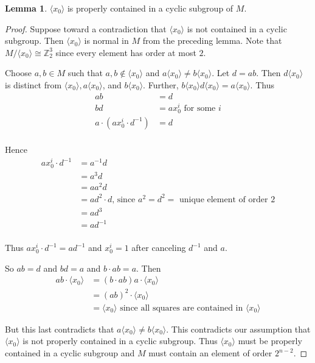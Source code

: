 \documentclass[12pt]{report}
\theoremstyle{definition}
\newtheorem{lem}[thm]{Lemma}
\begin{document}
\begin{lem}
	$\langle x_0 \rangle$ is properly contained in a cyclic subgroup of $M$.
\end{lem}

\begin{proof}
	Suppose toward a contradiction that $\langle x_0\rangle$ is not contained in a cyclic subgroup.
    Then $\langle x_0\rangle$ is normal in $M$ from the preceding lemma. Note that
    $M/\langle x_0\rangle\cong \mathbb{Z}_2^3$ since every element has order at most $2$.

	Choose $a, b\in M$ such that $a, b\notin\langle x_0\rangle$ and $a\langle x_0\rangle \neq b\langle x_0\rangle$.
    Let $d = ab$. Then $d\langle x_0\rangle$ is distinct from $\langle x_0\rangle, a\langle x_0\rangle$,
    and $b\langle x_0\rangle$. Further, $b\langle x_0\rangle d\langle x_0\rangle = a\langle x_0\rangle$.
    Thus
	\begin{align*}
	ab &= d\\
    bd &= ax_0^i\text{ for some $i$}\\
    a\cdot (ax_0^i \cdot d^{-1}) &= d\\
    \end{align*}

    Hence
    \begin{align*}
    ax_0^i \cdot d^{-1} &= a^{-1}d\\
    &= a^3 d\\
    &= aa^2 d\\
    &= ad^2\cdot d\text{, since $a^2 = d^2 =$ unique element of order 2}\\
    &= ad^3\\
    &= ad^{-1}\\
    \end{align*}

    Thus $ax_0^i \cdot d^{-1} = ad^{-1}$ and $x_0^i = 1$ after canceling $d^{-1}$ and $a$.

	So $ab = d$ and $bd = a$ and $b\cdot ab = a$. Then
	\begin{align*}
	ab\cdot \langle x_0\rangle &= (b\cdot ab)a\cdot \langle x_0\rangle\\
	&= (ab)^2\cdot \langle x_0\rangle\\
	&= \langle x_0\rangle\text{ since all squares are contained in $\langle x_0\rangle$}
	\end{align*}

	But this last contradicts that $a\langle x_0\rangle \neq b\langle x_0\rangle$. This contradicts our
    assumption that $\langle x_0\rangle$ is not properly contained in a cyclic subgroup. Thus
    $\langle x_0\rangle$ must be properly contained in a cyclic subgroup and $M$ must contain an
    element of order $2^{n - 2}$.
\end{proof}
\end{document}
